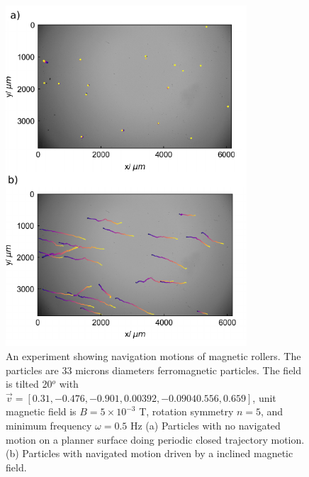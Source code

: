  \begin{figure}[p]
\centering
\includegraphics[width=9cm]{figures/5_6.pdf}
\caption{An experiment showing navigation motions of magnetic rollers. The particles are 33 microns diameters ferromagnetic particles. The field is tilted 20$^o$ with $\vec{v}=[0.31,-0.476,-0.901,0.00392, -0.0904
0.556,0.659]$, unit magnetic field is $B=5 \times 10^{-3}$ T, rotation symmetry $n=5$, and minimum frequency $\omega=0.5$ Hz (a) Particles with no navigated motion on a planner surface doing periodic closed trajectory motion.  (b) Particles with navigated motion driven by a inclined magnetic field.}
\label{fig:1}
\end{figure}
